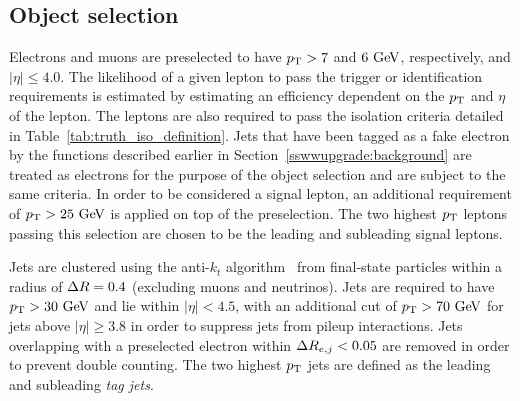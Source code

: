 \subsection{Object selection}\label{sswwupgrade:object_selection}
Electrons and muons are preselected to have $p_{\mathrm{T}} > 7$ and $6\gev$, respectively, and $|\eta| \le 4.0$.
The likelihood of a given lepton to pass the trigger or identification requirements is estimated by estimating an efficiency dependent on the $p_{\mathrm{T}}$ and $\eta$ of the lepton.
The leptons are also required to pass the isolation criteria detailed in Table~\ref{tab:truth_iso_definition}.
Jets that have been tagged as a fake electron by the functions described earlier in Section~\ref{sswwupgrade:background} are treated as electrons for the purpose of the object selection and are subject to the same criteria.
In order to be considered a signal lepton, an additional requirement of $\pt > 25\gev$ is applied on top of the preselection.
The two highest $p_{\mathrm{T}}$ leptons passing this selection are chosen to be the leading and subleading signal leptons.

Jets are clustered using the anti-$k_t$ algorithm~\cite{2008.antikt} from final-state particles within a radius of $\Delta R = 0.4$ (excluding muons and neutrinos).
Jets are required to have $\pt > 30\gev$ and lie within $|\eta| < 4.5$, with an additional cut of $\pt > 70\gev$ for jets above $|\eta| \ge 3.8$ in order to suppress jets from pileup interactions.
Jets overlapping with a preselected electron within $\Delta R_{e,j} < 0.05$ are removed in order to prevent double counting.
The two highest $p_{\mathrm{T}}$ jets are defined as the leading and subleading \emph{tag jets}.


